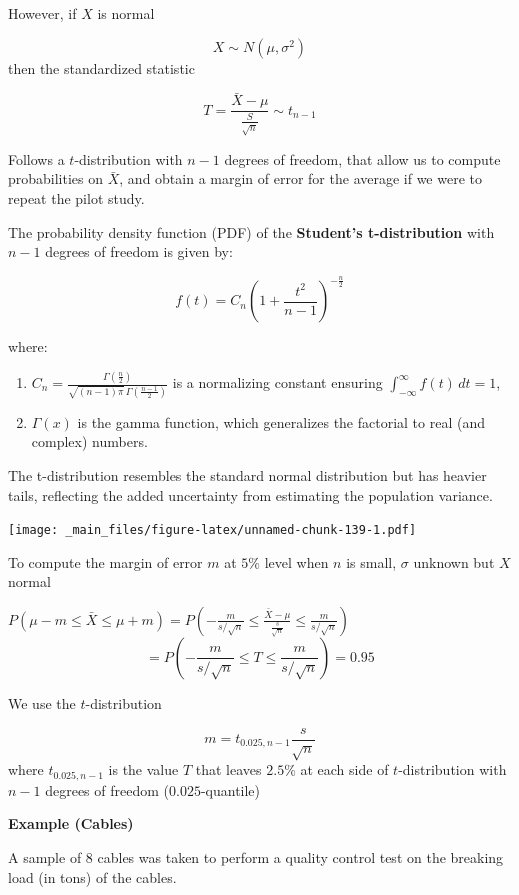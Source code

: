 \documentclass[
]{book}
\providecommand{\tightlist}{%
  \setlength{\itemsep}{0pt}\setlength{\parskip}{0pt}}
\begin{document}
However, if \(X\) is normal

\[X \sim N(\mu, \sigma^2)\]
then the standardized statistic

\[T=\frac{\bar{X}-\mu}{\frac{S}{\sqrt{n}}} \sim t_{n - 1}\]

Follows a \(t\)-distribution with \(n-1\) degrees of freedom, that allow us to compute probabilities on \(\bar{X}\), and obtain a margin of error for the average if we were to repeat the pilot study.

The probability density function (PDF) of the \textbf{Student's t-distribution} with \(n - 1\) degrees of freedom is given by:

\[
f(t) = C_n \left(1 + \frac{t^2}{n - 1}\right)^{-\frac{n}{2}}
\]

where:

\begin{enumerate}
\def\labelenumi{\arabic{enumi}.}
\tightlist
\item
  \(C_n = \frac{\Gamma\left(\frac{n}{2}\right)}{\sqrt{(n - 1)\pi} \, \Gamma\left(\frac{n - 1}{2}\right)}\) is a normalizing constant ensuring \(\int_{-\infty}^{\infty} f(t) \, dt = 1\),
\item
  \(\Gamma(x)\) is the gamma function, which generalizes the factorial to real (and complex) numbers.
\end{enumerate}

The t-distribution resembles the standard normal distribution but has heavier tails, reflecting the added uncertainty from estimating the population variance.

\texttt{[image: \_main\_files/figure-latex/unnamed-chunk-139-1.pdf]}

To compute the margin of error \(m\) at \(5\%\) level when \(n\) is small, \(\sigma\) unknown but \(X\) normal

\(P(\mu-m \leq \bar{X} \leq\mu + m)=P(-\frac{m}{s/\sqrt{n}} \leq \frac{\bar{X}-\mu}{\frac{s}{\sqrt{n}}} \leq\frac{m}{s/\sqrt{n}})\)
\[=P(-\frac{m}{s/\sqrt{n}} \leq T \leq\frac{m}{s/\sqrt{n}})=0.95\]

We use the \(t\)-distribution

\[m=t_{0.025, n-1} \frac{s}{\sqrt{n}}\]
where \(t_{0.025, n-1}\) is the value \(T\) that leaves \(2.5\%\) at each side of \(t\)-distribution with \(n-1\) degrees of freedom (\(0.025\)-quantile)

\textbf{Example (Cables)}

A sample of 8 cables was taken to perform a quality control test on the breaking load (in tons) of the cables.
\end{document}
